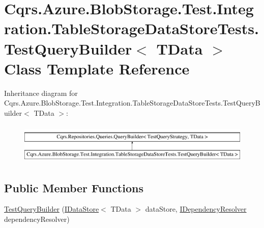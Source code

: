\hypertarget{classCqrs_1_1Azure_1_1BlobStorage_1_1Test_1_1Integration_1_1TableStorageDataStoreTests_1_1TestQueryBuilder}{}\section{Cqrs.\+Azure.\+Blob\+Storage.\+Test.\+Integration.\+Table\+Storage\+Data\+Store\+Tests.\+Test\+Query\+Builder$<$ T\+Data $>$ Class Template Reference}
\label{classCqrs_1_1Azure_1_1BlobStorage_1_1Test_1_1Integration_1_1TableStorageDataStoreTests_1_1TestQueryBuilder}
Inheritance diagram for Cqrs.\+Azure.\+Blob\+Storage.\+Test.\+Integration.\+Table\+Storage\+Data\+Store\+Tests.\+Test\+Query\+Builder$<$ T\+Data $>$\+:\begin{figure}[H]
\begin{center}
\leavevmode
\includegraphics[height=1.961471cm]{classCqrs_1_1Azure_1_1BlobStorage_1_1Test_1_1Integration_1_1TableStorageDataStoreTests_1_1TestQueryBuilder}
\end{center}
\end{figure}
\subsection*{Public Member Functions}
\begin{DoxyCompactItemize}
\item 
\hyperlink{classCqrs_1_1Azure_1_1BlobStorage_1_1Test_1_1Integration_1_1TableStorageDataStoreTests_1_1TestQueryBuilder_ada46a3061a76cebf70f07e5286c73f85_ada46a3061a76cebf70f07e5286c73f85}{Test\+Query\+Builder} (\hyperlink{interfaceCqrs_1_1DataStores_1_1IDataStore}{I\+Data\+Store}$<$ T\+Data $>$ data\+Store, \hyperlink{interfaceCqrs_1_1Configuration_1_1IDependencyResolver}{I\+Dependency\+Resolver} dependency\+Resolver)
\end{DoxyCompactItemize}
